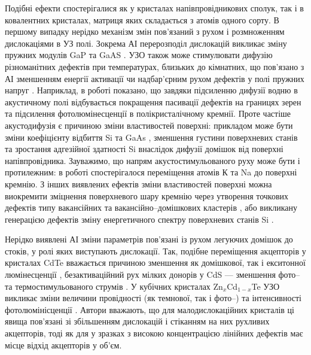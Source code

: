 Подібні ефекти спостерігалися як у кристалах напівпровідникових сполук, так і в ковалентних кристалах, матриця яких складається з атомів одного сорту.
В першому випадку нерідко механізм змін пов'язаний з рухом і розмноженням дислокаціями в УЗ полі.
Зокрема АІ перерозподіл дислокацій викликає зміну пружних модулів GaP та GaAS \cite{UST:GaP}.
УЗО також може стимулювати дифузію різноманітних дефектів при температурах, близьких до кімнатних, що пов'язано
з АІ зменшенням  енергії активації чи надбар'єрним рухом дефектів у полі пружних напруг \cite{USdif:FTT90}.
Наприклад, в роботі \cite{Ostapenko1999} показано, що завдяки підсиленню дифузії водню в акустичному полі відбувається покращення пасивації дефектів на границях зерен \cite{Ostapenko1999} та підсилення фотолюмінесценції \cite{Ostap:PhotoLum,ostapenko1997} в полікристалічному кремнії.
Проте частіше акустодифузія є причиною зміни властивостей поверхні:
прикладом може бути зміни коефіцієнту відбиття Si та GaAs \cite{Zaver}, зменшення густини  поверхневих станів \cite{Zaver:2008r} та зростання адгезійної здатності \cite{Zaver96} Si внаслідок дифузії домішок від поверхні напівпровідника.
Зауважимо, що напрям акустостимульованого руху може бути і протилежним:
в роботі \cite{Ostrov2002FTPr} спостерігалося переміщення атомів К та Na до поверхні кремнію.
З інших виявлених ефектів зміни властивостей поверхні можна виокремити зміцнення поверхневого шару кремнію через утворення точкових дефектів типу вакансійних та вакансійно--домішкових кластерів \cite{Ostrov2000FTPr},
 або викликану генерацією дефектів зміну енергетичного спектру поверхневих станів Si \cite{Zaver:2008r}.

Нерідко виявлені АІ зміни параметрів пов'язані із рухом легуючих домішок до стоків, у ролі яких виступають дислокації.
Так, подібне переміщення акцепторів у кристалах CdTe вважається причиною зменшення як домішкової, так і екситонної люмінесценції \cite{US:CdTe},
безактиваційний рух мілких донорів у CdS --- зменшення фото-- та термостимульованого струмів \cite{BorkovFTT,sheinkman1995,BORKOVSKA2003}.
У кубічних кристалах Zn$_x$Cd$_{1-x}$Te  УЗО викликає зміни величини провідності (як темнової, так і фото--) та інтенсивності фотолюмінісценції \cite{US:ZnCdTe}.
Автори вважають, що для малодислокаційних кристалів ці явища пов'язані зі збільшенням дислокацій і стіканням на них рухливих акцепторів, тоді як для у зразках з високою концентрацією лінійних дефектів має місце відхід акцепторів у об'єм.

